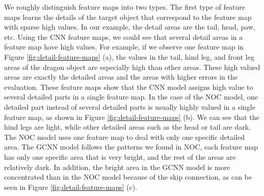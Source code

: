 We roughly distinguish feature maps into two types. The first type of feature maps learns the details of the target object that correspond to the feature map with sparse high values. In our example, the detail areas are the tail, head, paw, etc. Using the CNN feature maps, we could see that several detail areas in a feature map have high values. For example, if we observe one feature map in Figure \ref{fig:detail-feature-maps} (a), the values in the tail, hind leg, and front leg areas of the dragon object are especially high than other areas. These high valued areas are exactly the detailed areas and the areas with higher errors in the evaluation. These feature maps show that the CNN model assigns high value to several detailed parts in a single feature map. 
In the case of the NOC model, one detailed part instead of several detailed parts is usually highly valued in a single feature map, as shown in Figure \ref{fig:detail-feature-maps} (b). We can see that the hind legs are light, while other detailed areas such as the head or tail are dark. The NOC model uses one feature map to deal with only one specific detailed area. 
The GCNN model follows the patterns we found in NOC, each feature map has only one specific area that is very bright, and the rest of the areas are relatively dark. In addition, the bright area in the GCNN model is more concentrated than in the NOC model because of the skip connection, as can be seen in Figure \ref{fig:detail-feature-maps} (c). 







